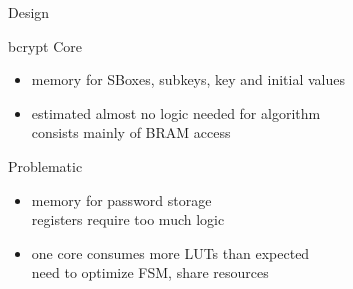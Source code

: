 \begin{frame}{Design}
    \begin{block}{bcrypt Core}
      \begin{itemize}
        \item memory for SBoxes, subkeys, key and initial values
        \item estimated almost no logic needed for algorithm\\consists mainly of BRAM access
      \end{itemize}
    \end{block}
    \begin{alertblock}{Problematic}
      \begin{itemize}
        \item memory for password storage\\registers require too much logic
        \item one core consumes more LUTs than expected\\need to optimize FSM, share resources
      \end{itemize}
    \end{alertblock}
\end{frame}

